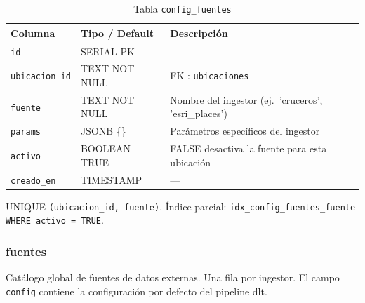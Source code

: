 \documentclass[12pt, a4paper]{article}
\begin{document}
\begin{table}[H]
\centering
\renewcommand{\arraystretch}{1.2}
\begin{tabular}{llp{5.5cm}}
\toprule
\textbf{Columna} & \textbf{Tipo / Default} & \textbf{Descripción} \\
\midrule
\texttt{id}           & SERIAL PK     & — \\
\texttt{ubicacion\_id} & TEXT NOT NULL & FK : \texttt{ubicaciones} \\
\texttt{fuente}       & TEXT NOT NULL  & Nombre del ingestor (ej.\ 'cruceros', 'esri\_places') \\
\texttt{params}       & JSONB \{\}    & Parámetros específicos del ingestor \\
\texttt{activo}       & BOOLEAN TRUE  & FALSE desactiva la fuente para esta ubicación \\
\texttt{creado\_en}   & TIMESTAMP     & — \\
\bottomrule
\end{tabular}
\caption{Tabla \texttt{config\_fuentes}}
\end{table}

UNIQUE \texttt{(ubicacion\_id, fuente)}. Índice parcial: \texttt{idx\_config\_fuentes\_fuente WHERE activo = TRUE}.

\subsubsection{fuentes}

Catálogo global de fuentes de datos externas. Una fila por ingestor. El campo \texttt{config} contiene la configuración por defecto del pipeline dlt.
\end{document}
